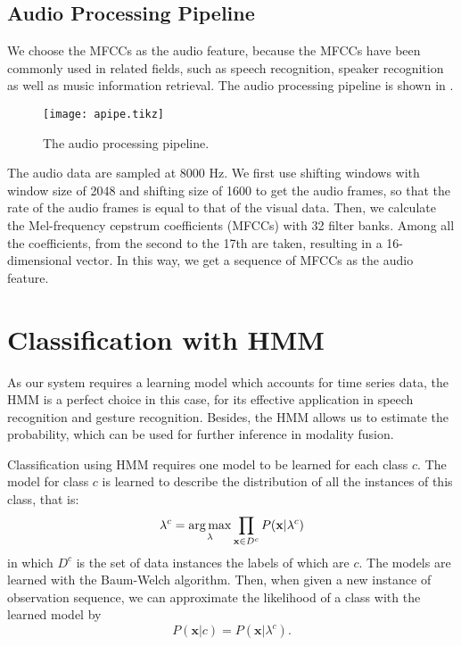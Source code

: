 \documentclass[12pt,final,twoside]{report}
\begin{document}
\subsection{Audio Processing Pipeline}
We choose the MFCCs as the audio feature, because the MFCCs have been commonly used in related fields, such as speech recognition, speaker recognition as well as music information retrieval. The audio processing pipeline is shown in .

\begin{figure}[t]
  \centering
  \texttt{[image: apipe.tikz]}
  \caption{The audio processing pipeline.}
  \label{fig:apipe}
\end{figure}

The audio data are sampled at 8000 Hz. We first use shifting windows with window size of 2048 and shifting size of 1600 to get the audio frames, so that the rate of the audio frames is equal to that of the visual data. Then, we calculate the Mel-frequency cepstrum coefficients (MFCCs) with 32 filter banks. Among all the coefficients, from the second to the 17th are taken, resulting in a 16-dimensional vector. In this way, we get a sequence of MFCCs as the audio feature.

\section{Classification with HMM}
As our system requires a learning model which accounts for time series data, the HMM is a perfect choice in this case, for its effective application in speech recognition and gesture recognition. Besides, the HMM allows us to estimate the probability, which can be used for further inference in modality fusion.

Classification using HMM requires one model to be learned for each class $c$. The model for class $c$ is learned to describe the distribution of all the instances of this class, that is:
\begin{equation}
  \lambda^c = \operatorname*{arg\,max}_{\lambda} \prod_{\mathbf{x} \in D^c} P(\mathbf{x}|\lambda^c)
\end{equation}
in which $D^c$ is the set of data instances the labels of which are $c$. The models are learned with the Baum-Welch algorithm. Then, when given a new instance of observation sequence, we can approximate the likelihood of a class with the learned model by
\begin{equation}
  P(\mathbf{x}|c) = P(\mathbf{x}|\lambda^c) .
\end{equation}
\end{document}
